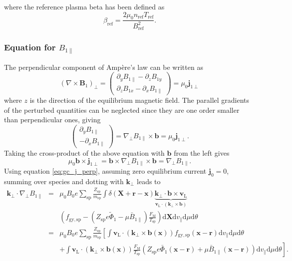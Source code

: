 \documentclass[a4paper,10pt]{article}
\newcommand{\st}[1]{\mathrm{#1}} %
\renewcommand{\vec}[1]{\mathbf{#1}}
\begin{document}
where the reference plasma beta has been defined as
\begin{equation}
	\beta_{\st{ref}} = \frac{2 \mu_0 n_{\st{ref}} T_{\st{ref}}}{B_{\st{ref}}^2}.
	\label{eq:beta}
\end{equation}


\subsubsection{Equation for $B_{1 \parallel}$}
The perpendicular component of Amp\`ere's law can be written as
\[ (\nabla \times \mathbf{B}_1)_{\perp} = \left( \begin{array}{c} \partial_y B_{1 \parallel} - \partial_z B_{1 y} \\ \partial_z B_{1x} - \partial_x B_{1 \parallel} \end{array} \right) = \mu_0 \mathbf{j}_{1 \perp} \]
where $z$ is the direction of the equilibrium magnetic field. The parallel gradients of the perturbed quantities can be neglected since they are one order smaller than perpendicular ones, giving
\begin{equation*}
	\left( \begin{array}{c} \partial_y B_{1 \parallel} \\ - \partial_x B_{1 \parallel} \end{array} \right) = \nabla_{\perp} B_{1 \parallel} \times \mathbf{b} = \mu_0 \mathbf{j}_{1 \perp}.
\end{equation*}
Taking the cross-product of the above equation with $\vec{b}$ from the left gives
\[ \mu_0 \vec{b} \times \vec{j}_{1 \perp} = \vec{b} \times \nabla_{\perp} B_{1 \parallel} \times \vec{b} = \nabla_{\perp} B_{1 \parallel}. \]
Using equation \ref{eq:gc_j_perp}, assuming zero equilibrium current $\vec{j}_0 = 0$, summing over species and dotting with $\vec{k}_{\perp}$ leads to
\begin{eqnarray*}
	\vec{k}_{\perp} \cdot \nabla_{\perp} B_{1 \parallel} &=& \mu_0 B_0 e \sum_{\st{sp}} \frac{Z_{\st{sp}}}{m_{\st{sp}}} \int \delta(\vec{X}+\vec{r}-\vec{x}) \underbrace{\vec{k}_{\perp} \cdot \vec{b} \times \vec{v}_{\st{L}}}_{\vec{v}_{\st{L}} \cdot (\vec{k}_{\perp} \times \vec{b})} \\ 
	&& \left( f_{\st{gy,sp}} - \left( Z_{\st{sp}} e \widetilde{\Phi}_{1} - \mu \bar{B}_{1 \parallel} \right) \frac{F_{\st{M}}}{T_{\st{sp}}} \right) \mathrm{d} \vec{X} \mathrm{d} v_{\parallel} \mathrm{d} \mu \mathrm{d} \theta \\
	&=& \mu_0 B_0 e \sum_{\st{sp}} \frac{Z_{\st{sp}}}{m_{\st{sp}}} \left[ \int \vec{v}_{\st{L}} \cdot (\vec{k}_{\perp} \times \vec{b}(\vec{x})) f_{\st{gy,sp}}(\vec{x}-\vec{r}) \mathrm{d} v_{\parallel} \mathrm{d} \mu \mathrm{d} \theta \right. \\ 
	&& \left. + \int \vec{v}_{\st{L}} \cdot (\vec{k}_{\perp} \times \vec{b}(\vec{x})) \frac{F_{\st{M}}}{T_{\st{sp}}}\left( Z_{\st{sp}} e \bar{\Phi}_1(\vec{x}-\vec{r}) + \mu \bar{B}_{1 \parallel}(\vec{x}-\vec{r}) \right)  \mathrm{d} v_{\parallel} \mathrm{d} \mu \mathrm{d} \theta \right].
\end{eqnarray*}
\end{document}
